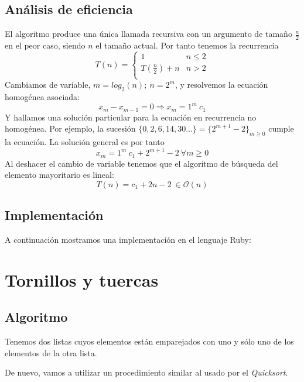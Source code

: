 \documentclass[a4paper, 11pt]{article} %
\begin{document}
\subsection{Análisis de eficiencia}
El algoritmo produce una única llamada recursiva con un argumento de tamaño $\frac{n}{2}$ en el peor caso, siendo $n$ el tamaño actual. Por tanto tenemos la recurrencia
\begin{equation}
\label{eqmay}
T(n)=\left\lbrace
	    \begin{array}{lr}
            1 & n\le 2\\
            T\left(\frac{n}{2}\right) + n & n>2\\
            \end{array}
	    \right.
\end{equation} 
Cambiamos de variable, $m = log_2(n);\ n = 2^m$, y resolvemos la ecuación homogénea asociada:
$$ x_m-x_{m-1}=0 \Rightarrow x_m = 1^m\ c_1 $$
Y hallamos una solución particular para la ecuación en recurrencia no homogénea. Por ejemplo, la sucesión $\{0, 2, 6, 14, 30\dots\}=\{2^{m+1}-2\}_{m\ge 0}$ 
cumple la ecuación. La solución general es por tanto
$$ x_m = 1^m\ c_1 + 2^{m+1}-2\ \forall m\ge 0$$
Al deshacer el cambio de variable tenemos que el algoritmo de búsqueda del elemento mayoritario es lineal:
$$ T(n) = c_1 + 2n-2\ \in \mathcal{O}(n)$$

\subsection{Implementación}
A continuación mostramos una implementación en el lenguaje Ruby:

\small
\texttt{}
\normalsize

\section {Tornillos y tuercas}
  \subsection{Algoritmo}

    Tenemos dos listas cuyos elementos están emparejados con uno y sólo uno de los elementos de la otra lista.
    
    De nuevo, vamos a utilizar un procedimiento similar al usado por el \textit{Quicksort}.
    
\end{document}
